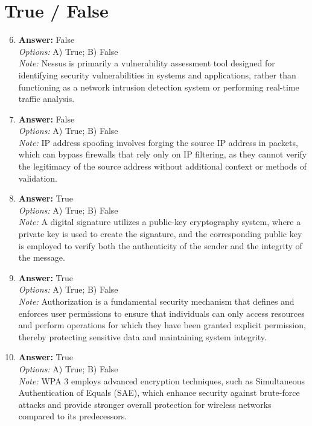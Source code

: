 \documentclass[12pt]{article}
\begin{document}
\section*{True / False}
\begin{enumerate}[label=\arabic*.]
\setcounter{enumi}{5}
\item \textbf{Answer:} False
\\ \textit{Options:} A) True; B) False
\\ \textit{Note:} Nessus is primarily a vulnerability assessment tool designed for identifying security vulnerabilities in systems and applications, rather than functioning as a network intrusion detection system or performing real-time traffic analysis.
\item \textbf{Answer:} False
\\ \textit{Options:} A) True; B) False
\\ \textit{Note:} IP address spoofing involves forging the source IP address in packets, which can bypass firewalls that rely only on IP filtering, as they cannot verify the legitimacy of the source address without additional context or methods of validation.
\item \textbf{Answer:} True
\\ \textit{Options:} A) True; B) False
\\ \textit{Note:} A digital signature utilizes a public-key cryptography system, where a private key is used to create the signature, and the corresponding public key is employed to verify both the authenticity of the sender and the integrity of the message.
\item \textbf{Answer:} True
\\ \textit{Options:} A) True; B) False
\\ \textit{Note:} Authorization is a fundamental security mechanism that defines and enforces user permissions to ensure that individuals can only access resources and perform operations for which they have been granted explicit permission, thereby protecting sensitive data and maintaining system integrity.
\item \textbf{Answer:} True
\\ \textit{Options:} A) True; B) False
\\ \textit{Note:} WPA 3 employs advanced encryption techniques, such as Simultaneous Authentication of Equals (SAE), which enhance security against brute-force attacks and provide stronger overall protection for wireless networks compared to its predecessors.
\end{enumerate}
\end{document}
